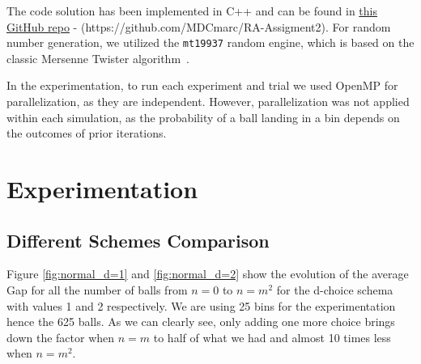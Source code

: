 \documentclass[a4paper, 11pt]{article}
\begin{document}
The code solution has been implemented in C++ and can be found in \href{https://github.com/MDCmarc/RA-Assigment2}{this GitHub repo} - (https://github.com/MDCmarc/RA-Assigment2). 
For random number generation, we utilized the \texttt{mt19937} random engine, which is based on the classic Mersenne Twister algorithm~\cite{MersenneTwister}. 

In the experimentation, to run each experiment and trial we used OpenMP for parallelization, as they are independent. However, parallelization was not applied within each simulation, as the probability of a ball landing in a bin depends on the outcomes of prior iterations.

\clearpage
\section{Experimentation}


\subsection{Different Schemes Comparison}

Figure \ref{fig:normal_d=1} and \ref{fig:normal_d=2} show the evolution of the average Gap for all the number of balls from $n=0$ to $n=m^2$ for the d-choice schema with values 1 and 2 respectively. We are using 25 bins for the experimentation hence the 625 balls. As we can clearly see, only adding one more choice brings down the factor when $n=m$ to half of what we had and almost 10 times less when $n=m^2$.
\end{document}
